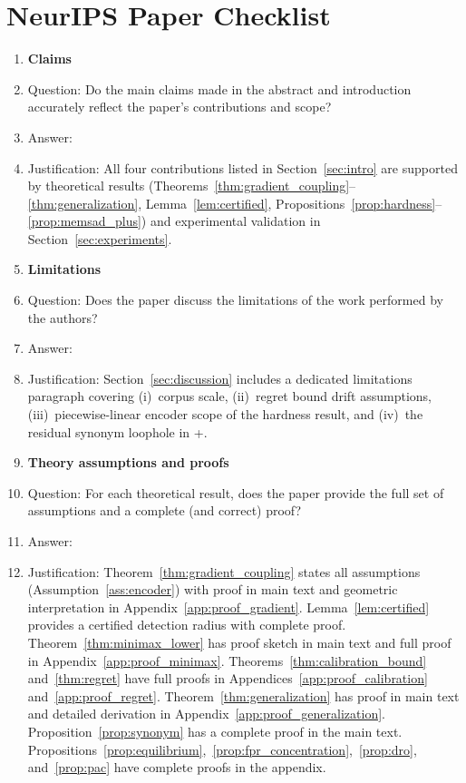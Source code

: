 \section*{NeurIPS Paper Checklist}

\begin{enumerate}

\item {\bf Claims}
    \item[] Question: Do the main claims made in the abstract and introduction accurately reflect the paper's contributions and scope?
    \item[] Answer: \answerYes{}
    \item[] Justification: All four contributions listed in Section~\ref{sec:intro} are supported by theoretical results (Theorems~\ref{thm:gradient_coupling}--\ref{thm:generalization}, Lemma~\ref{lem:certified}, Propositions~\ref{prop:hardness}--\ref{prop:memsad_plus}) and experimental validation in Section~\ref{sec:experiments}.

\item {\bf Limitations}
    \item[] Question: Does the paper discuss the limitations of the work performed by the authors?
    \item[] Answer: \answerYes{}
    \item[] Justification: Section~\ref{sec:discussion} includes a dedicated limitations paragraph covering (i)~corpus scale, (ii)~regret bound drift assumptions, (iii)~piecewise-linear encoder scope of the hardness result, and (iv)~the residual synonym loophole in \memsad{}+.

\item {\bf Theory assumptions and proofs}
    \item[] Question: For each theoretical result, does the paper provide the full set of assumptions and a complete (and correct) proof?
    \item[] Answer: \answerYes{}
    \item[] Justification: Theorem~\ref{thm:gradient_coupling} states all assumptions (Assumption~\ref{ass:encoder}) with proof in main text and geometric interpretation in Appendix~\ref{app:proof_gradient}. Lemma~\ref{lem:certified} provides a certified detection radius with complete proof. Theorem~\ref{thm:minimax_lower} has proof sketch in main text and full proof in Appendix~\ref{app:proof_minimax}. Theorems~\ref{thm:calibration_bound} and~\ref{thm:regret} have full proofs in Appendices~\ref{app:proof_calibration} and~\ref{app:proof_regret}. Theorem~\ref{thm:generalization} has proof in main text and detailed derivation in Appendix~\ref{app:proof_generalization}. Proposition~\ref{prop:synonym} has a complete proof in the main text. Propositions~\ref{prop:equilibrium},~\ref{prop:fpr_concentration},~\ref{prop:dro}, and~\ref{prop:pac} have complete proofs in the appendix.


\end{enumerate}
